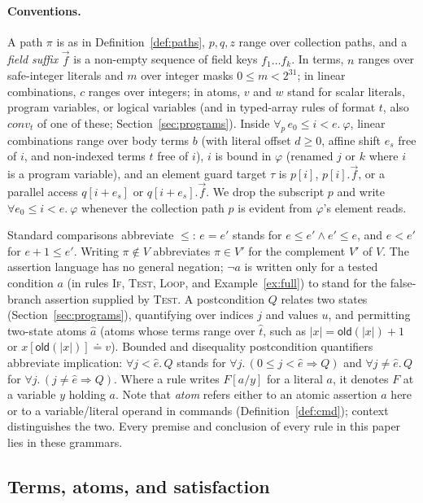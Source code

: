\documentclass[10pt,a4paper]{article}
\theoremstyle{definition}
\theoremstyle{remark}
\newcommand{\kw}[1]{\mathsf{#1}}
\newcommand{\old}{\kw{old}}
\newcommand{\len}[1]{|#1|}
\begin{document}
\paragraph{Conventions.}
A path $\pi$ is as in Definition~\ref{def:paths}, $p,q,z$ range over
collection paths, and a \emph{field suffix} $\vec f$ is a non-empty
sequence of field keys $f_1\ldots f_k$. In terms, $n$ ranges over
safe-integer literals and $m$ over integer masks $0\le m<2^{31}$; in
linear combinations, $c$ ranges over integers; in atoms, $v$ and $w$ stand
for scalar literals, program variables, or logical variables (and in
typed-array rules of format $t$, also $\mathit{conv}_t$ of one of these;
Section~\ref{sec:programs}). Inside $\forall_{p}\, e_0\le i<e.\ \varphi$,
linear combinations range over body terms $b$ (with literal offset
$d\ge 0$, affine shift $e_s$ free of $i$, and non-indexed terms $t$ free
of $i$), $i$ is bound in $\varphi$ (renamed $j$ or $k$ where $i$ is a
program variable), and an element guard target $\tau$ is $p[i]$,
$p[i].\vec f$, or a parallel access $q[i+e_s]$ or $q[i+e_s].\vec f$. We
drop the subscript $p$ and write $\forall e_0\le i<e.\ \varphi$ whenever
the collection path $p$ is evident from $\varphi$'s element reads.

Standard comparisons abbreviate $\le$: $e=e'$ stands for
$e\le e'\wedge e'\le e$, and $e<e'$ for $e+1\le e'$. Writing
$\pi\notin V$ abbreviates $\pi\in V'$ for the complement $V'$ of $V$.
The assertion language has no general negation; $\neg a$ is written only
for a tested condition $a$ (in rules \textsc{If}, \textsc{Test},
\textsc{Loop}, and Example~\ref{ex:full}) to stand for the false-branch
assertion supplied by \textsc{Test}. A postcondition $Q$ relates two
states (Section~\ref{sec:programs}), quantifying over indices $j$ and
values $u$, and permitting two-state atoms $\hat a$ (atoms whose terms
range over $\hat t$, such as $\len x=\old(\len x)+1$ or
$x[\old(\len x)]\doteq v$). Bounded and disequality postcondition
quantifiers abbreviate implication: $\forall j<\hat e.\,Q$ stands for
$\forall j.\,(0\le j<\hat e\Rightarrow Q)$ and $\forall j\ne\hat e.\,Q$
for $\forall j.\,(j\ne\hat e\Rightarrow Q)$. Where a rule writes
$F[a/y]$ for a literal $a$, it denotes $F$ at a variable $y$ holding $a$.
Note that \emph{atom} refers either to an atomic assertion $a$ here or to
a variable/literal operand in commands (Definition~\ref{def:cmd});
context distinguishes the two. Every premise and conclusion of every rule
in this paper lies in these grammars.

\subsection{Terms, atoms, and satisfaction}
\end{document}

